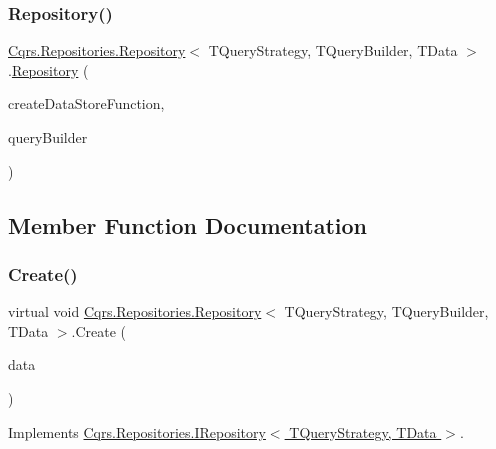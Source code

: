 \subsubsection{\texorpdfstring{Repository()}{Repository()}}
{\footnotesize\ttfamily \hyperlink{classCqrs_1_1Repositories_1_1Repository}{Cqrs.\+Repositories.\+Repository}$<$ T\+Query\+Strategy, T\+Query\+Builder, T\+Data $>$.\hyperlink{classCqrs_1_1Repositories_1_1Repository}{Repository} (\begin{DoxyParamCaption}\item[{Func$<$ \hyperlink{interfaceCqrs_1_1DataStores_1_1IDataStore}{I\+Data\+Store}$<$ T\+Data $>$$>$}]{create\+Data\+Store\+Function,  }\item[{T\+Query\+Builder}]{query\+Builder }\end{DoxyParamCaption})\hspace{0.3cm}{\ttfamily [protected]}}



\subsection{Member Function Documentation}
\mbox{\label{classCqrs_1_1Repositories_1_1Repository_a5d5d78262533aa2ab32eddbab83869bd}} 
\subsubsection{\texorpdfstring{Create()}{Create()}\hspace{0.1cm}{\footnotesize\ttfamily [1/2]}}
{\footnotesize\ttfamily virtual void \hyperlink{classCqrs_1_1Repositories_1_1Repository}{Cqrs.\+Repositories.\+Repository}$<$ T\+Query\+Strategy, T\+Query\+Builder, T\+Data $>$.Create (\begin{DoxyParamCaption}\item[{T\+Data}]{data }\end{DoxyParamCaption})\hspace{0.3cm}{\ttfamily [virtual]}}



Implements \hyperlink{interfaceCqrs_1_1Repositories_1_1IRepository_a240c8d094207a22b0c805a5c830d8615}{Cqrs.\+Repositories.\+I\+Repository$<$ T\+Query\+Strategy, T\+Data $>$}.

